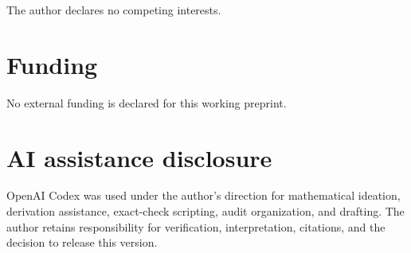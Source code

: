\documentclass[11pt]{article}
\theoremstyle{definition}
\theoremstyle{remark}
\begin{document}
The author declares no competing interests.

\section*{Funding}

No external funding is declared for this working preprint.

\section*{AI assistance disclosure}

OpenAI Codex was used under the author's direction for mathematical ideation, derivation assistance, exact-check scripting, audit organization, and drafting. The author retains responsibility for verification, interpretation, citations, and the decision to release this version.
\end{document}
